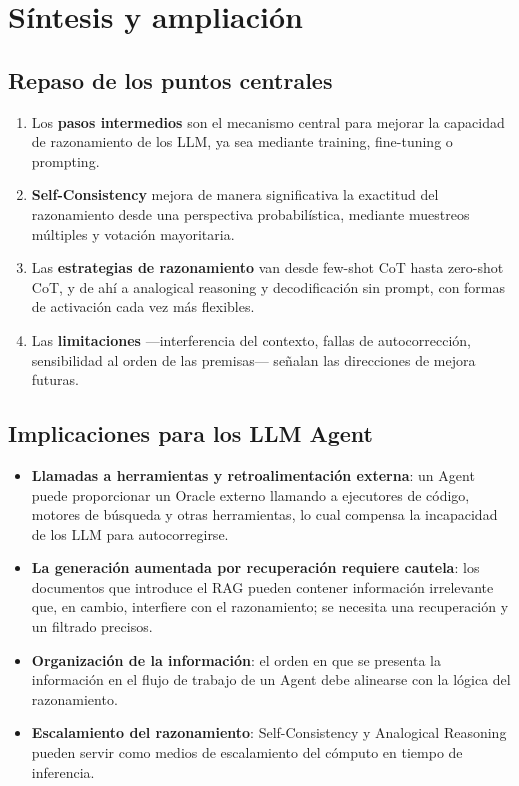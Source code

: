 \section{Síntesis y ampliación}

\subsection{Repaso de los puntos centrales}

\begin{enumerate}
    \item Los \textbf{pasos intermedios} son el mecanismo central para mejorar la capacidad de razonamiento de los LLM, ya sea mediante training, fine-tuning o prompting.
    \item \textbf{Self-Consistency} mejora de manera significativa la exactitud del razonamiento desde una perspectiva probabilística, mediante muestreos múltiples y votación mayoritaria.
    \item Las \textbf{estrategias de razonamiento} van desde few-shot CoT hasta zero-shot CoT, y de ahí a analogical reasoning y decodificación sin prompt, con formas de activación cada vez más flexibles.
    \item Las \textbf{limitaciones} —interferencia del contexto, fallas de autocorrección, sensibilidad al orden de las premisas— señalan las direcciones de mejora futuras.
\end{enumerate}

\subsection{Implicaciones para los LLM Agent}

\begin{itemize}
    \item \textbf{Llamadas a herramientas y retroalimentación externa}: un Agent puede proporcionar un Oracle externo llamando a ejecutores de código, motores de búsqueda y otras herramientas, lo cual compensa la incapacidad de los LLM para autocorregirse.
    \item \textbf{La generación aumentada por recuperación requiere cautela}: los documentos que introduce el RAG pueden contener información irrelevante que, en cambio, interfiere con el razonamiento; se necesita una recuperación y un filtrado precisos.
    \item \textbf{Organización de la información}: el orden en que se presenta la información en el flujo de trabajo de un Agent debe alinearse con la lógica del razonamiento.
    \item \textbf{Escalamiento del razonamiento}: Self-Consistency y Analogical Reasoning pueden servir como medios de escalamiento del cómputo en tiempo de inferencia.
\end{itemize}

